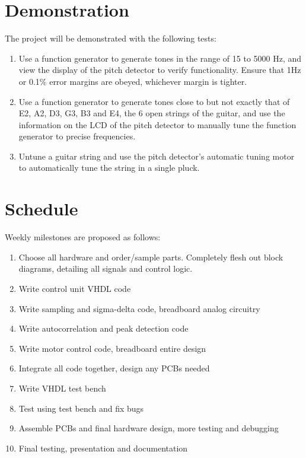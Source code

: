 \documentclass[aps,letterpaper,10pt]{revtex4}
\begin{document}
\section{Demonstration}
The project will be demonstrated with the following tests:
\begin{enumerate}
\item Use a function generator to generate tones in the range of 15 to 5000 Hz, and view the display of the pitch detector to verify functionality. Ensure that 1Hz or 0.1\% error margins are obeyed, whichever margin is tighter. 
\item Use a function generator to generate tones close to but not exactly that of E2, A2, D3, G3, B3 and E4, the 6 open strings of the guitar, and use the information on the LCD of the pitch detector to manually tune the function generator to precise frequencies. 
\item Untune a guitar string and use the pitch detector's automatic tuning motor to automatically tune the string in a single pluck.
\end{enumerate}

\section{Schedule}
Weekly milestones are proposed as follows:
\begin{enumerate}
\item Choose all hardware and order/sample parts. Completely flesh out block diagrams, detailing all signals and control logic.
\item Write control unit VHDL code
\item Write sampling and sigma-delta code, breadboard analog circuitry
\item Write autocorrelation and peak detection code
\item Write motor control code, breadboard entire design
\item Integrate all code together, design any PCBs needed
\item Write VHDL test bench
\item Test using test bench and fix bugs
\item Assemble PCBs and final hardware design, more testing and debugging
\item Final testing, presentation and documentation
\end{enumerate}
	





\theendnotes
\end{document}

